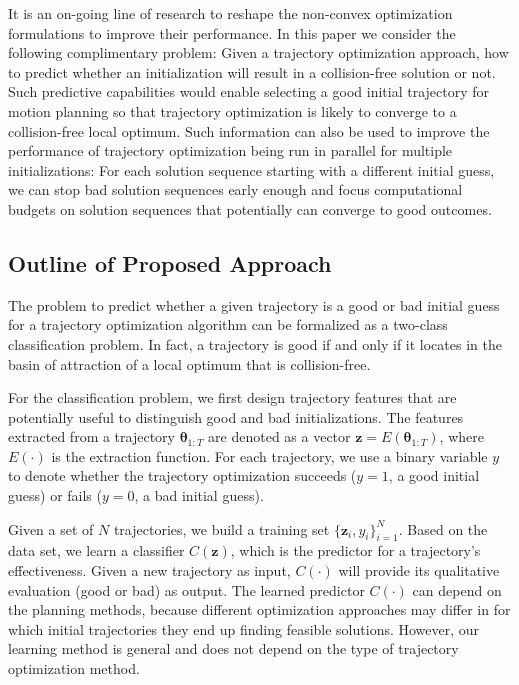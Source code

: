 \documentclass[letterpaper, 10 pt, conference]{ieeeconf}  %
\newcommand{\btheta}{\mbox{$\bm \theta$}}
\newcommand{\fsym}{\mbox{$\mathbf z$}}
\begin{document}
It is an on-going line of research to reshape the non-convex optimization formulations to improve their performance. In this paper we consider the following complimentary problem: Given a trajectory optimization approach, how to predict whether an initialization will result in a collision-free solution or not. Such predictive capabilities would enable selecting a good initial trajectory for motion planning so that trajectory optimization is likely to converge to a collision-free local optimum. Such information can also be used to improve the performance of trajectory optimization being run in parallel for multiple initializations: For each solution sequence starting with a different initial guess, we can stop bad solution sequences early enough and focus computational budgets on solution sequences that potentially can converge to good outcomes.


\subsection{Outline of Proposed Approach}
The problem to predict whether a given trajectory is a good or bad initial guess for a trajectory optimization algorithm can be formalized as a two-class classification problem. In fact, a trajectory is good if and only if it locates in the basin of attraction of a local optimum that is collision-free.


For the classification problem, we first design trajectory features that are potentially useful to distinguish good and bad initializations. The features extracted from a trajectory $\btheta_{1:T}$ are denoted as a vector $\fsym = E(\btheta_{1:T})$, where $E(\cdot)$ is the extraction function. For each trajectory, we use a binary variable $y$ to denote whether the trajectory optimization succeeds ($y = 1$, a good initial guess) or fails ($y = 0$, a bad initial guess). 


Given a set of $N$ trajectories, we build a training set $\{\fsym_i, y_i\}_{i=1}^N$. Based on the data set, we learn a classifier $C(\fsym) $, which is the predictor for a trajectory's effectiveness. Given a new trajectory as input, $C(\cdot)$ will provide its qualitative evaluation (good or bad) as output. The learned predictor $C(\cdot)$ can depend on the planning methods, because different optimization approaches may differ in for which initial trajectories they end up finding feasible solutions.  However, our learning method is general and does not depend on the type of trajectory optimization method.
\end{document}
